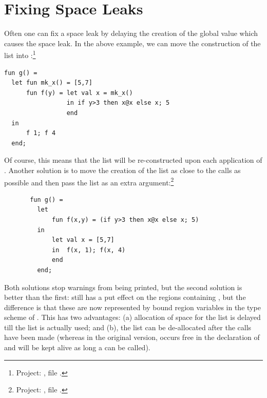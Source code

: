 \documentclass[12pt]{book}
\begin{document}
\section{Fixing Space Leaks}
Often one can fix a space leak by delaying the creation of the
global value which causes the space leak. In the above example,
we can move the construction of the list into :\footnote{Project:
, file .}
\begin{verbatim}
fun g() = 
  let fun mk_x() = [5,7]
      fun f(y) = let val x = mk_x()
                 in if y>3 then x@x else x; 5 
                 end
  in 
      f 1; f 4
  end;
\end{verbatim}
Of course, this means that the list will be re-constructed upon each application
of . Another solution is to move the creation of the list as close to 
the calls as possible and then pass the list as an extra argument:\footnote{Project:
, file .}
\begin{verbatim}
       fun g() = 
         let 
             fun f(x,y) = (if y>3 then x@x else x; 5)
         in 
             let val x = [5,7]
             in  f(x, 1); f(x, 4)
             end
         end;
\end{verbatim}
Both solutions stop warnings from being printed, 
but the second solution is better than the first:  still has a
put effect on the regions containing , but the difference
is that these are now represented by bound region variables in the type scheme of
. This has two advantages: (a) allocation of space for the list is
delayed till the list is actually used; and (b), the list can be de-allocated
after the calls have been made (whereas in the original version,  occurs
free in the declaration of  and will be kept alive as long a  can be called).
\end{document}
